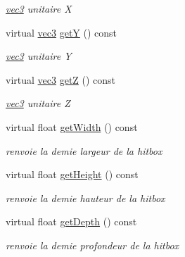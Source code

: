 \begin{DoxyCompactItemize}
\begin{DoxyCompactList}\small\item\em \hyperlink{structvec3}{vec3} unitaire X \end{DoxyCompactList}\item 
virtual \hyperlink{structvec3}{vec3} \hyperlink{class_scene_a8b925540bc8fc2976eec67998f5c3bd3}{get\+Y} () const 
\begin{DoxyCompactList}\small\item\em \hyperlink{structvec3}{vec3} unitaire Y \end{DoxyCompactList}\item 
virtual \hyperlink{structvec3}{vec3} \hyperlink{class_scene_a4762ba0c1a51eeba4a19a515b546b6bd}{get\+Z} () const 
\begin{DoxyCompactList}\small\item\em \hyperlink{structvec3}{vec3} unitaire Z \end{DoxyCompactList}\item 
virtual float \hyperlink{class_scene_a3fa3346da04b7aa00cb5a30171e70a24}{get\+Width} () const 
\begin{DoxyCompactList}\small\item\em renvoie la demie largeur de la hitbox \end{DoxyCompactList}\item 
virtual float \hyperlink{class_scene_a83026eeb7ec401111634beb553cb2f8e}{get\+Height} () const 
\begin{DoxyCompactList}\small\item\em renvoie la demie hauteur de la hitbox \end{DoxyCompactList}\item 
virtual float \hyperlink{class_scene_a96b58a841f6295813072d258aa9a9236}{get\+Depth} () const 
\begin{DoxyCompactList}\small\item\em renvoie la demie profondeur de la hitbox \end{DoxyCompactList}\end{DoxyCompactItemize}
